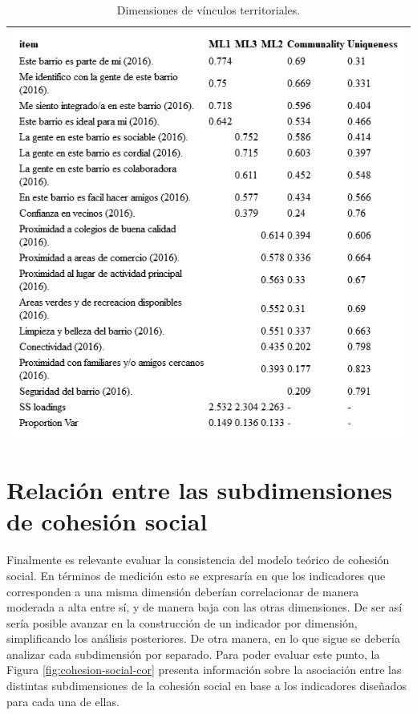 \documentclass[
  12pt,
]{book}
\begin{document}
\begin{longtable}[]{@{}l@{}}
\caption{\label{tab:cohesion-territorial-fa}Dimensiones de vínculos territoriales.}\tabularnewline
\toprule
\endhead
\includegraphics[width=6.77083in,height=\textheight]{output/tables/cohesion_territorial_fa.png}\tabularnewline
\bottomrule
\end{longtable}

\hypertarget{relaciuxf3n-entre-las-subdimensiones-de-cohesiuxf3n-social}{%
\section{Relación entre las subdimensiones de cohesión social}\label{relaciuxf3n-entre-las-subdimensiones-de-cohesiuxf3n-social}}

Finalmente es relevante evaluar la consistencia del modelo teórico de cohesión social. En términos de medición esto se expresaría en que los indicadores que corresponden a una misma dimensión deberían correlacionar de manera moderada a alta entre sí, y de manera baja con las otras dimensiones. De ser así sería posible avanzar en la construcción de un indicador por dimensión, simplificando los análisis posteriores. De otra manera, en lo que sigue se debería analizar cada subdimensión por separado. Para poder evaluar este punto, la Figura \ref{fig:cohesion-social-cor} presenta información sobre la asociación entre las distintas subdimensiones de la cohesión social en base a los indicadores diseñados para cada una de ellas.
\end{document}
